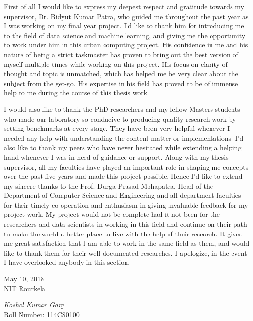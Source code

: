 \thispagestyle{empty} 
\noindent 

First of all I would like to express my deepest respect and gratitude towards my supervisor,
Dr. Bidyut Kumar Patra, who guided me throughout the past year as I was working on my
final year project. I’d like to thank him for introducing me to the field of data science and
machine learning, and giving me the opportunity to work under him in this urban computing
project. His confidence in me and his nature of being a strict taskmaster has proven to bring
out the best version of myself multiple times while working on this project. His focus on
clarity of thought and topic is unmatched, which has helped me be very clear about the
subject from the get-go. His expertise in his field has proved to be of immense help to me
during the course of this thesis work.

\par

I would also like to thank the PhD researchers and my fellow Masters students who made our
laboratory so conducive to producing quality research work by setting benchmarks at every
stage. They have been very helpful whenever I needed any help with understanding the
content matter or implementations. I’d also like to thank my peers who have never hesitated
while extending a helping hand whenever I was in need of guidance or support.
Along with my thesis supervisor, all my faculties have played an important role in shaping
me concepts over the past five years and made this project possible. Hence I’d like to
extend my sincere thanks to the Prof. Durga Prasad Mohapatra, Head of the Department of
Computer Science and Engineering and all department faculties for their timely co-operation
and enthusiasm in giving invaluable feedback for my project work.
My project would not be complete had it not been for the researchers and data scientists
in working in this field and continue on their path to make the world a better place to live
with the help of their research. It gives me great satisfaction that I am able to work in the
same field as them, and would like to thank them for their well-documented researches. I
apologize, in the event I have overlooked anybody in this section.

\vspace{15mm}
\begin{minipage}{.45\linewidth}
\begin{flushleft}
May 10, 2018\\
NIT Rourkela
\end{flushleft}
\end{minipage}
\begin{minipage}{.45\linewidth}
\begin{flushright}
\textit{Koshal Kumar Garg}\\
Roll Number: 114CS0100
\end{flushright}
\end{minipage}